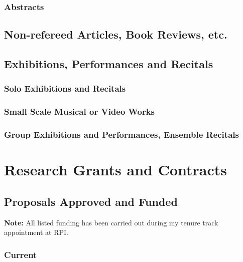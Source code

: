 \documentclass[11 pt]{rpibio}
\begin{document}
  \subsubsection{Abstracts}
  \begin{refcontext}[labelprefix=A]
    \printbibliography[filter=abstracts_conferences, heading=none,resetnumbers=true]
  \end{refcontext} 


\subsection{Non-refereed Articles, Book Reviews, etc.}

\subsection{Exhibitions, Performances and Recitals}
\subsubsection{Solo Exhibitions and Recitals}
\subsubsection{Small Scale Musical or Video Works}
\subsubsection{Group Exhibitions and Performances, Ensemble Recitals}

\section{Research Grants and Contracts}
\printfundedsummary %

\subsection{Proposals Approved and Funded}
\textbf{Note:} All listed funding has been carried out during my tenure track appointment at RPI.

\subsubsection{Current}
\end{document}
